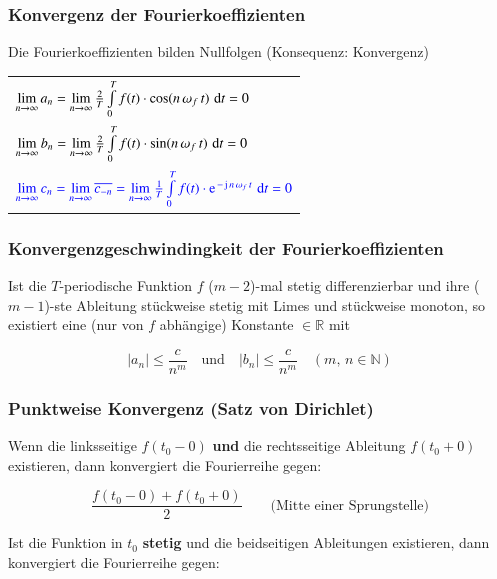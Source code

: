 \subsubsection{Konvergenz der Fourierkoeffizienten}

Die Fourierkoeffizienten bilden Nullfolgen (Konsequenz: Konvergenz)

\renewcommand{\arraystretch}{2}
\begin{tabular}{l}
    $\lim \limits_{n \to \infty} a_n = \lim \limits_{n \to \infty} \frac{2}{T} \int \limits_0^T f(t) \cdot \cos(n\, \omega_f \, t) \, \mathop{} \! \mathrm{d} t = 0$ \\
    $\lim \limits_{n \to \infty} b_n = \lim \limits_{n \to \infty} \frac{2}{T} \int \limits_0^T f(t) \cdot \sin(n\, \omega_f \, t) \, \mathop{} \! \mathrm{d} t = 0$ \\
    $\cbl{\lim \limits_{n \to \infty} c_n = \lim \limits_{n \to \infty} \overline{c_{-n}} = \lim \limits_{n \to\infty} \frac{1}{T} \int \limits_0^T f(t) \cdot  \e^{- \jimg \, n \, \omega_f \, t} \, \diff t = 0}$
\end{tabular}
\renewcommand{\arraystretch}{1}


\subsubsection{Konvergenzgeschwindingkeit der Fourierkoeffizienten}

Ist die $T$-periodische Funktion $f$ ($m-2$)-mal stetig differenzierbar und ihre ($m-1$)-ste Ableitung stückweise stetig mit Limes und
stückweise monoton, so existiert eine (nur von $f$ abhängige) Konstante $\in \mathbb{R}$ mit

$$ \vert a_n \vert \leq \frac{c}{n^m} \quad \text{und} \quad \vert b_n \vert \leq \frac{c}{n^m} \quad (m, \, n \in \mathbb{N}) $$


\subsubsection{Punktweise Konvergenz (Satz von Dirichlet)}

Wenn die linksseitige $f(t_0 - 0)$ \textbf{und} die rechtsseitige Ableitung $f(t_0 + 0)$ existieren, dann konvergiert die Fourierreihe gegen:

$$ \frac{f(t_0 - 0) + f(t_0 + 0)}{2} \qquad \text{(Mitte einer Sprungstelle)} $$


Ist die Funktion in $t_0$ \textbf{stetig} und die beidseitigen Ableitungen existieren, dann konvergiert die Fourierreihe gegen:

